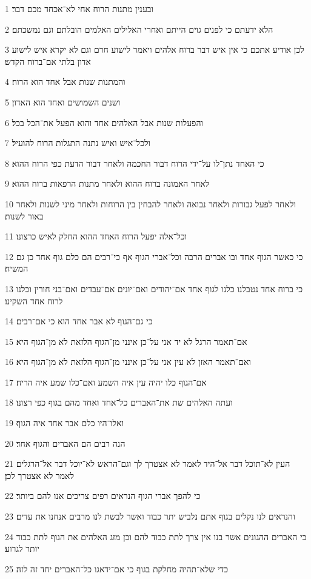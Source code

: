 \par 1 ובענין מתנות הרוח אחי לא־אכחד מכם דבר׃
\par 2 הלא ידעתם כי לפנים גוים הייתם ואחרי האלילים האלמים הובלתם וגם נמשכתם׃
\par 3 לכן אודיע אתכם כי אין איש דבר ברוח אלהים ויאמר לישוע חרם וגם לא יקרא איש לישוע אדון בלתי אם־ברוח הקדש׃
\par 4 והמתנות שנות אבל אחד הוא הרוח׃
\par 5 ושנים השמושים ואחד הוא האדון׃
\par 6 והפעלות שנות אבל האלהים אחד והוא הפעל את־הכל בכל׃
\par 7 ולכל־איש ואיש נתנה התגלות הרוח להועיל׃
\par 8 כי האחד נתן־לו על־ידי הרוח דבור החכמה ולאחר דבור הדעת כפי הרוח ההוא׃
\par 9 לאחר האמונה ברוח ההוא ולאחר מתנות הרפאות ברוח ההוא׃
\par 10 ולאחר לפעל גבורות ולאחר נבואה ולאחר להבחין בין הרוחות ולאחר מיני לשנות ולאחר באור לשנות׃
\par 11 וכל־אלה יפעל הרוח האחד ההוא החלק לאיש כרצונו׃
\par 12 כי כאשר הגוף אחד ובו אברים הרבה וכל־אברי הגוף אף כי־רבים הם כלם גוף אחד כן גם המשיח׃
\par 13 כי ברוח אחד נטבלנו כלנו לגוף אחד אם־יהודים ואם־יונים אם־עבדים ואם־בני חורין וכלנו לרוח אחד השקינו׃
\par 14 כי גם־הגוף לא אבר אחד הוא כי אם־רבים׃
\par 15 אם־תאמר הרגל לא יד אני על־כן אינני מן־הגוף הלזאת לא מן־הגוף היא׃
\par 16 ואם־תאמר האזן לא עין אני על־כן אינני מן־הגוף הלזאת לא מן־הגוף היא׃
\par 17 אם־הגוף כלו יהיה עין איה השמע ואם־כלו שמע איה הריח׃
\par 18 ועתה האלהים שת את־האברים כל־אחד ואחד מהם בגוף כפי רצונו׃
\par 19 ואלו־היו כלם אבר אחד איה הגוף׃
\par 20 הנה רבים הם האברים והגוף אחד׃
\par 21 העין לא־תוכל דבר אל־היד לאמר לא אצטרך לך וגם־הראש לא־יוכל דבר אל־הרגלים לאמר לא אצטרך לכן׃
\par 22 כי להפך אברי הגוף הנראים רפים צריכים אנו להם ביותר׃
\par 23 והנראים לנו נקלים בגוף אתם נלביש יתר כבוד ואשר לבשת לנו מרבים אנחנו את עדים׃
\par 24 כי האברים ההגונים אשר בנו אין צרך לתת כבוד להם וכן מזג האלהים את הגוף לתת כבוד יותר לגרוע׃
\par 25 כדי שלא־תהיה מחלקת בגוף כי אם־ידאגו כל־האברים יחד זה לזה׃

